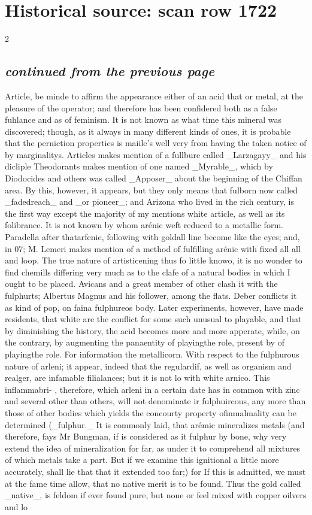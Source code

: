 \documentclass[10pt]{article}
\begin{document}
\section*{Historical source: scan row 1722}
\begin{multicols}{2}
\subsection*{\textit{continued from the previous page}}
Article, be minde to affirm the appearance either of an acid that or metal, at the pleasure of the operator; and therefore has been confidered both as a false fuhlance and as of feminism. It is not known as what time this mineral was discovered; though, as it always in many different kinds of ones, it is probable that the perniction properties is maiile’s well very from having the taken notice of by marginalitys. Articles makes mention of a fullbure called \_Larzagayy\_ and his dicliple Theodorants makes mention of one named \_Myrable\_, which by Diodocides and others was called \_Apposer\_ about the beginning of the Chiffan area. By this, however, it appears, but they only means that fulborn now called \_fadedreach\_ and \_or pioneer\_; and Arizona who lived in the rich century, is the first way except the majority of my mentions white article, as well as its folibrance. It is not known by whom arénic weft reduced to a metallic form. Paradella after thatarfenie, following with goldall line become like the eyes; and, in 07; M. Lemeri makes mention of a method of fulfilling arénic with fixed all all and loop. The true nature of artisticening thus fo little knowo, it is no wonder to find chemills differing very much as to the clafe of a natural bodies in which I ought to be placed. Avicans and a great member of other clash it with the fulphurts; Albertus Magnus and his follower, among the flats. Deber conflicts it as kind of pop, on faina fulphureos body. Later experiments, however, have made residents, that white are the conflict for some such unusual to playable, and that by diminishing the history, the acid becomes more and more apperate, while, on the contrary, by augmenting the panaentity of playingthe role, present by of playingthe role. For information the metallicorn. With respect to the fulphurous nature of arleni; it appear, indeed that the regulardif, as well as organism and realger, are infamable filialances; but it is not lo with white arnico. This inflammabri- , therefore, which arleni in a certain date has in common with zinc and several other than others, will not denominate ir fulphuircous, any more than those of other bodies which yields the concourty property ofinmalmality can be determined (\_fulphur.\_ It is commonly laid, that arémic mineralizes metals (and therefore, fays Mr Bungman, if is considered as it fulphur by bone, why very extend the idea of mineralization for far, as under it to comprehend all mixtures of which metals take a part. But if we examine this ignitional a little more accurately, shall lie that that it extended too far;) for If this is admitted, we must at the fame time allow, that no native merit is to be found. Thus the gold called \_native\_, is feldom if ever found pure, but none or feel mixed with copper oilvers and lo 
\end{multicols}
\end{document}
